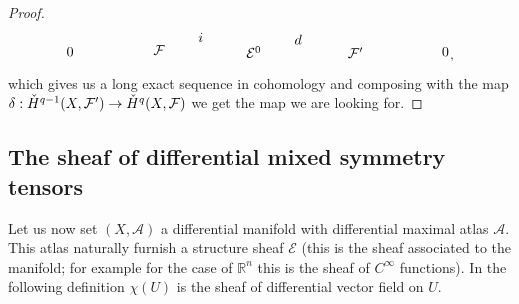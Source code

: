 \documentclass[a4paper,12pt]{article}
\begin{document}
\begin{proof}
\begin{equation}
\begin{tikzpicture}[x=0.75pt,y=0.75pt,yscale=-1,xscale=1]
\draw (178,168.4) node [anchor=north west][inner sep=0.75pt]    {$i$};
\draw (52,182.5) node [anchor=north west][inner sep=0.75pt]    {$0$};
\draw (321,182.4) node [anchor=north west][inner sep=0.75pt]    {$\mathcal{F} '$};
\draw (224,181.4) node [anchor=north west][inner sep=0.75pt]    {$\mathcal{E}^{0}$};
\draw (135,180.4) node [anchor=north west][inner sep=0.75pt]    {$\mathcal{F}$};
\draw (270,170.4) node [anchor=north west][inner sep=0.75pt]    {$d$};
\draw (411,182.5) node [anchor=north west][inner sep=0.75pt]    {$0$};
\end{tikzpicture},
\end{equation}
which gives us a long exact sequence in cohomology and composing with the map $\delta: \Check{H}^{q-1}(X,\mathcal{F}') \rightarrow \Check{H}^{q}(X,\mathcal{F})$ we get the map we are looking for.
\end{proof}
\subsection{The sheaf of differential mixed symmetry tensors}
Let us now set $(X,\mathcal{A})$ a differential manifold with differential maximal atlas $\mathcal{A}$. This atlas naturally furnish a structure sheaf $\mathcal{E}$ (this is the sheaf associated to the manifold; for example for the case of $\mathbb{R}^n$ this is the sheaf of $C^{\infty}$ functions). In the following definition $\chi(U)$ is the sheaf of differential vector field on $U$.
\end{document}
